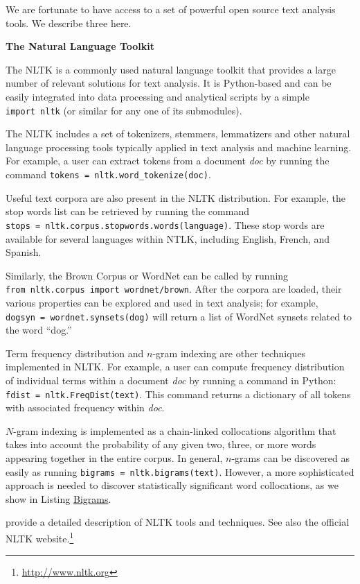 \documentclass[]{krantz}
\begin{document}
We are fortunate to have access to a set of powerful open source text
analysis tools. We describe three here.

\textbf{The Natural Language Toolkit}

The NLTK is a commonly used natural language toolkit that provides a
large number of relevant solutions for text analysis. It is Python-based
and can be easily integrated into data processing and analytical scripts
by a simple \texttt{import\ nltk} (or similar for any one of its
submodules).

The NLTK includes a set of tokenizers, stemmers, lemmatizers and other
natural language processing tools typically applied in text analysis and
machine learning. For example, a user can extract tokens from a document
\emph{doc} by running the command
\texttt{tokens\ =\ nltk.word\_tokenize(doc)}.

Useful text corpora are also present in the NLTK distribution. For
example, the stop words list can be retrieved by running the command
\texttt{stops\ =\ nltk.corpus.stopwords.words(language)}. These stop
words are available for several languages within NTLK, including
English, French, and Spanish.

Similarly, the Brown Corpus or WordNet can be called by running
\texttt{from\ nltk.corpus\ import\ wordnet/brown}. After the corpora are
loaded, their various properties can be explored and used in text
analysis; for example,
\texttt{dogsyn\ =\ wordnet.synsets(\textquotesingle{}dog\textquotesingle{})}
will return a list of WordNet synsets related to the word ``dog.''

Term frequency distribution and \(n\)-gram indexing are other techniques
implemented in NLTK. For example, a user can compute frequency
distribution of individual terms within a document \emph{doc} by running
a command in Python: \texttt{fdist\ =\ nltk.FreqDist(text)}. This
command returns a dictionary of all tokens with associated frequency
within \emph{doc}.

\(N\)-gram indexing is implemented as a chain-linked collocations
algorithm that takes into account the probability of any given two,
three, or more words appearing together in the entire corpus. In
general, \(n\)-grams can be discovered as easily as running
\texttt{bigrams\ =\ nltk.bigrams(text)}. However, a more sophisticated
approach is needed to discover statistically significant word
collocations, as we show in Listing
\protect\hyperlink{list:text1}{Bigrams}.

\citet{bird-09} provide a detailed description of NLTK tools and
techniques. See also the official NLTK website.\footnote{\url{http://www.nltk.org}}
\end{document}
